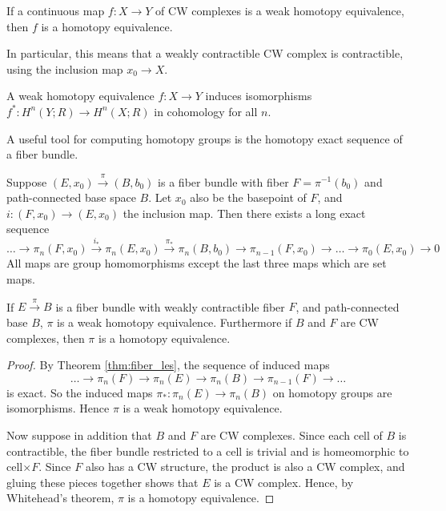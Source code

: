 \begin{thm} 
	If a continuous map $f:X\to Y$ of CW complexes 
	is a weak homotopy equivalence, then  $f$ is a homotopy equivalence. 
\end{thm}
In particular, this
means that a weakly contractible CW complex is contractible, using the inclusion
map $x_0 \to X$. 

\begin{thm} \label{thm:weak_to_cohomology}
	A weak homotopy equivalence $f:X\to Y$ induces isomorphisms
	$f^*:H^n(Y;R)\to H^n(X;R)$ in cohomology for all  $n$.
\end{thm}
A useful tool for computing homotopy groups is the homotopy exact sequence of a
fiber bundle. 
\begin{thm} \label{thm:fiber_les}
	Suppose $(E,x_0) \xrightarrow{\pi} (B,b_0)$ is a fiber bundle with fiber
	$F=\pi^{-1}(b_0)$ and path-connected base space $B$. Let  $x_0$ also be the
	basepoint of $F$, and  $i:(F,x_0)\to (E,x_0)$ the inclusion map. Then there
	exists a long exact sequence
	\[
		\ldots\to\pi_n(F,x_0) \xrightarrow{i_*}\pi_n(E,x_0)
		\xrightarrow{\pi_*}\pi_n(B,b_0)
		\to \pi_{n-1}(F,x_0)\to\ldots\to\pi_0(E,x_0)\to 0
	\] 
	All maps are group homomorphisms except the last three maps which are set
	maps.
\end{thm}

\begin{prop} \label{prop:total_base_iso}
	If $E \xrightarrow{\pi} B$ is a fiber bundle with weakly contractible fiber $F$,
	and path-connected base $B$, $\pi$ is a weak homotopy equivalence.
	Furthermore if $B$ and $F$ are CW complexes, 
	then $\pi$ is a homotopy equivalence.  
\end{prop}
\begin{proof}
	By Theorem \ref{thm:fiber_les}, the sequence of induced maps
	\[
	\ldots \to \pi_n(F) \to \pi_n(E) \to\pi_n(B) \to
	\pi_{n-1}(F)\to \ldots
	\] 
	is exact. So the induced maps $\pi_* : \pi_n(E) \to
	\pi_n(B)$ on homotopy groups are isomorphisms. Hence $\pi$ is a weak
	homotopy equivalence. 

	Now suppose in addition that $B$ and $F$ are CW complexes. 
	Since each cell of $B$ is contractible, the fiber bundle
	restricted to a cell is trivial and is homeomorphic to  cell$\times F$. 
	Since  $F$ also has a CW structure, the product is also a CW complex, and
	gluing these pieces together shows that $E$ is a CW complex. Hence, by
	Whitehead's theorem,  $\pi$ is a homotopy equivalence. 
\end{proof}

